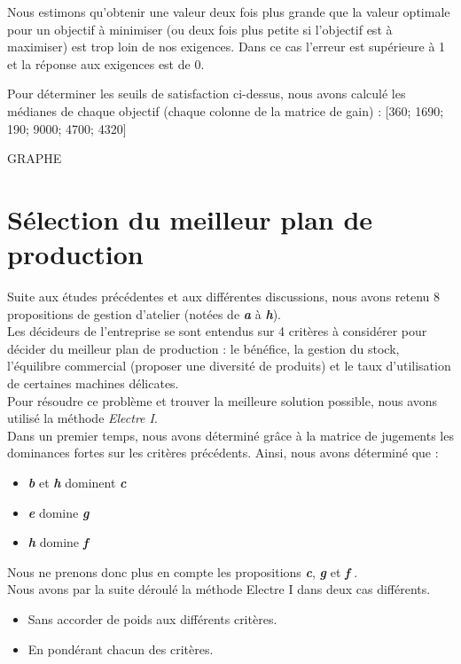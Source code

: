 \documentclass[12pt]{article}
\begin{document}
Nous estimons qu’obtenir une valeur deux fois plus grande que la valeur optimale pour un objectif à minimiser (ou deux fois plus petite si l’objectif est à maximiser) est trop loin de nos exigences. Dans ce cas l’erreur est supérieure à 1 et la réponse aux exigences est de 0.



Pour déterminer les seuils de satisfaction ci-dessus, nous avons calculé les médianes de chaque objectif (chaque colonne de la matrice de gain) : [360; 1690; 190; 9000; 4700; 4320]

GRAPHE



 
\section{Sélection du meilleur plan de production}
Suite aux études précédentes et aux différentes discussions, nous avons retenu 8 propositions de gestion d'atelier (notées de \textbf{\emph{a}} à \textbf{\emph{h}}).\\
Les décideurs de l'entreprise se sont entendus sur 4 critères à considérer pour décider du meilleur plan de production : le bénéfice, la gestion du stock, l'équilibre commercial (proposer une diversité de produits) et le taux d'utilisation de certaines machines délicates.\\
Pour résoudre ce problème et trouver la meilleure solution possible, nous avons utilisé la méthode \emph{Electre I}.\\
Dans un premier temps, nous avons déterminé grâce à la matrice de jugements les dominances fortes sur les critères précédents. Ainsi, nous avons déterminé que :
\begin{itemize}
\item \textbf{\emph{b}} et \textbf{\emph{h}} dominent \textbf{\emph{c}}
\item \textbf{\emph{e}} domine \textbf{\emph{g}}
\item \textbf{\emph{h}} domine \textbf{\emph{f}}
\end{itemize}
Nous ne prenons donc plus en compte les propositions \textbf{\emph{c}}, \textbf{\emph{g}} et \textbf{\emph{f}} .\\
Nous avons par la suite déroulé la méthode Electre I dans deux cas différents. 
\begin{itemize}
\item Sans accorder de poids aux différents critères.
\item En pondérant chacun des critères.
\end{itemize}
\end{document}
